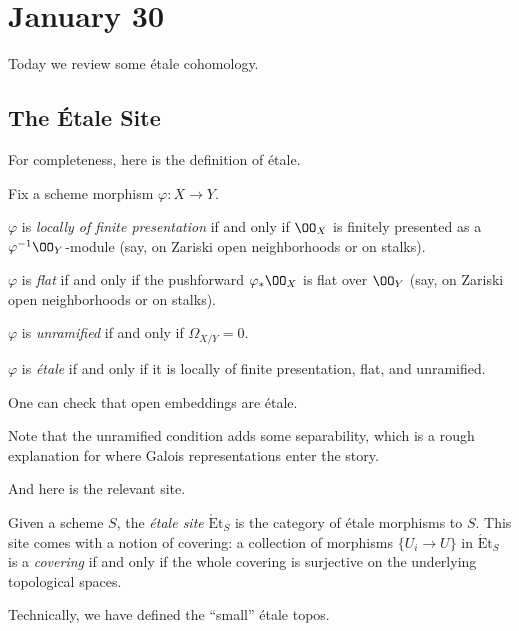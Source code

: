\documentclass[../notes.tex]{subfiles}
\begin{document}
\section{January 30}

Today we review some \'etale cohomology.

\subsection{The \'Etale Site}
For completeness, here is the definition of \'etale.
\begin{defihelper}[\'etale] 
	Fix a scheme morphism $\varphi\colon X\to Y$.
	\begin{listalph}
		\item $\varphi$ is \textit{locally of finite presentation} if and only if $\OO_X$ is finitely presented as a $\varphi^{-1}\OO_Y$-module (say, on Zariski open neighborhoods or on stalks).
		\item $\varphi$ is \textit{flat} if and only if the pushforward $\varphi_*\OO_X$ is flat over $\OO_Y$ (say, on Zariski open neighborhoods or on stalks).
		\item $\varphi$ is \textit{unramified} if and only if $\Omega_{X/Y}=0$.
		\item $\varphi$ is \textit{\'etale} if and only if it is locally of finite presentation, flat, and unramified.
	\end{listalph}
\end{defihelper}
\begin{example}
	One can check that open embeddings are \'etale.
\end{example}
\begin{remark}
	Note that the unramified condition adds some separability, which is a rough explanation for where Galois representations enter the story.
\end{remark}
And here is the relevant site.
\begin{defihelper} 
	Given a scheme $S$, the \textit{\'etale site} $\mathrm{\acute Et}_S$ is the category of \'etale morphisms to $S$. This site comes with a notion of covering: a collection of morphisms $\{U_i\to U\}$ in $\mathrm{\acute Et}_S$ is a \textit{covering} if and only if the whole covering is surjective on the underlying topological spaces.
\end{defihelper}
\begin{remark}
	Technically, we have defined the ``small'' \'etale topos.
\end{remark}
\end{document}
